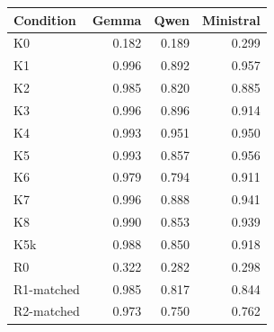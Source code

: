 \begin{tabular}{lrrr}
\toprule
Condition & Gemma & Qwen & Ministral \\
\midrule
K0 & 0.182 & 0.189 & 0.299 \\
K1 & 0.996 & 0.892 & 0.957 \\
K2 & 0.985 & 0.820 & 0.885 \\
K3 & 0.996 & 0.896 & 0.914 \\
K4 & 0.993 & 0.951 & 0.950 \\
K5 & 0.993 & 0.857 & 0.956 \\
K6 & 0.979 & 0.794 & 0.911 \\
K7 & 0.996 & 0.888 & 0.941 \\
K8 & 0.990 & 0.853 & 0.939 \\
K5k & 0.988 & 0.850 & 0.918 \\
R0 & 0.322 & 0.282 & 0.298 \\
R1-matched & 0.985 & 0.817 & 0.844 \\
R2-matched & 0.973 & 0.750 & 0.762 \\
\bottomrule
\end{tabular}
